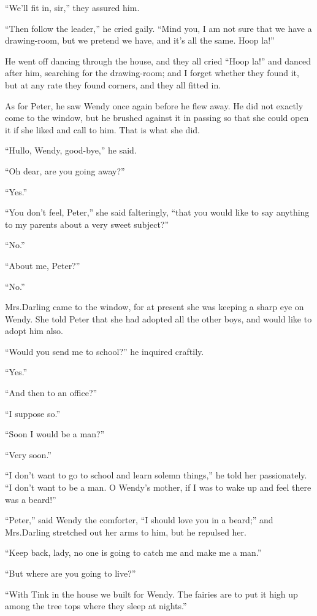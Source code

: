 “We’ll fit in, sir,” they assured him.

“Then follow the leader,” he cried gaily.
“Mind you, I am not sure that we have a drawing-room,
but we pretend we have, and it’s all the same.
Hoop la!”

He went off dancing through the house,
and they all cried “Hoop la!\@” and danced after him,
searching for the drawing-room;
and I forget whether they found it,
but at any rate they found corners, and they all fitted in.

As for Peter, he saw Wendy once again before he flew away.
He did not exactly come to the window,
but he brushed against it in passing so that she could open it if she liked and call to him.
That is what she did.

“Hullo, Wendy, good-bye,” he said.

“Oh dear, are you going away?”

“Yes.”

“You don’t feel, Peter,” she said falteringly,
“that you would like to say anything to my parents about a very sweet subject?”

“No.”

“About me, Peter?”

“No.”

Mrs.\@ Darling came to the window,
for at present she was keeping a sharp eye on Wendy.
She told Peter that she had adopted all the other boys,
and would like to adopt him also.

“Would you send me to school?\@” he inquired craftily.

“Yes.”

“And then to an office?”

“I suppose so.”

“Soon I would be a man?”

“Very soon.”

“I don’t want to go to school and learn solemn things,”
he told her passionately.
“I don’t want to be a man.
O Wendy’s mother, if I was to wake up and feel there was a beard!”

“Peter,” said Wendy the comforter, “I should love you in a beard;”
and Mrs.\@ Darling stretched out her arms to him, but he repulsed her.

“Keep back, lady, no one is going to catch me and make me a man.”

“But where are you going to live?”

“With Tink in the house we built for Wendy.
The fairies are to put it high up among the tree tops where they sleep at nights.”

